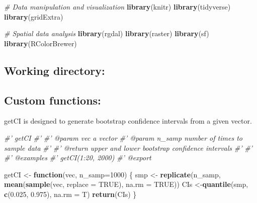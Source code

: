 \documentclass[]{article}
\newenvironment{Shaded}{\begin{snugshade}}{\end{snugshade}}
\newcommand{\CommentTok}[1]{\textcolor[rgb]{0.56,0.35,0.01}{\textit{#1}}}
\newcommand{\ControlFlowTok}[1]{\textcolor[rgb]{0.13,0.29,0.53}{\textbf{#1}}}
\newcommand{\DataTypeTok}[1]{\textcolor[rgb]{0.13,0.29,0.53}{#1}}
\newcommand{\DecValTok}[1]{\textcolor[rgb]{0.00,0.00,0.81}{#1}}
\newcommand{\FloatTok}[1]{\textcolor[rgb]{0.00,0.00,0.81}{#1}}
\newcommand{\KeywordTok}[1]{\textcolor[rgb]{0.13,0.29,0.53}{\textbf{#1}}}
\newcommand{\NormalTok}[1]{#1}
\newcommand{\OperatorTok}[1]{\textcolor[rgb]{0.81,0.36,0.00}{\textbf{#1}}}
\newcommand{\OtherTok}[1]{\textcolor[rgb]{0.56,0.35,0.01}{#1}}
\newcommand{\StringTok}[1]{\textcolor[rgb]{0.31,0.60,0.02}{#1}}
\begin{document}
\begin{Shaded}
\end{Shaded}

\begin{Shaded}
\begin{Highlighting}[]
\CommentTok{# Data manipulation and visualization}
\KeywordTok{library}\NormalTok{(knitr)}
\KeywordTok{library}\NormalTok{(tidyverse)}
\KeywordTok{library}\NormalTok{(gridExtra)}

\CommentTok{# Spatial data analysis}
\KeywordTok{library}\NormalTok{(rgdal)}
\KeywordTok{library}\NormalTok{(raster)}
\KeywordTok{library}\NormalTok{(sf)}
\KeywordTok{library}\NormalTok{(RColorBrewer)}
\end{Highlighting}
\end{Shaded}

\hypertarget{working-directory}{%
\subsection{Working directory:}\label{working-directory}}

\hypertarget{custom-functions}{%
\subsection{Custom functions:}\label{custom-functions}}

getCI is designed to generate bootstrap confidence intervals from a
given vector.

\begin{Shaded}
\begin{Highlighting}[]
\CommentTok{#' getCI}
\CommentTok{#' }
\CommentTok{#' @param vec a vector}
\CommentTok{#' @param n_samp number of times to sample data}
\CommentTok{#'}
\CommentTok{#' @return upper and lower bootstrap confidence intervals}
\CommentTok{#' }
\CommentTok{#'}
\CommentTok{#' @examples}
\CommentTok{#'    getCI(1:20, 2000)}
\CommentTok{#' @export}

\NormalTok{getCI <-}\StringTok{ }\ControlFlowTok{function}\NormalTok{(vec, }\DataTypeTok{n_samp=}\DecValTok{1000}\NormalTok{) \{}
\NormalTok{  smp <-}\StringTok{ }\KeywordTok{replicate}\NormalTok{(n_samp, }\KeywordTok{mean}\NormalTok{(}\KeywordTok{sample}\NormalTok{(vec, }\DataTypeTok{replace =} \OtherTok{TRUE}\NormalTok{), }\DataTypeTok{na.rm =} \OtherTok{TRUE}\NormalTok{))}
\NormalTok{  CIs <-}\KeywordTok{quantile}\NormalTok{(smp, }\KeywordTok{c}\NormalTok{(}\FloatTok{0.025}\NormalTok{, }\FloatTok{0.975}\NormalTok{), }\DataTypeTok{na.rm =}\NormalTok{ T)}
  \KeywordTok{return}\NormalTok{(CIs)}
\NormalTok{\}}
\end{Highlighting}
\end{Shaded}
\end{document}
